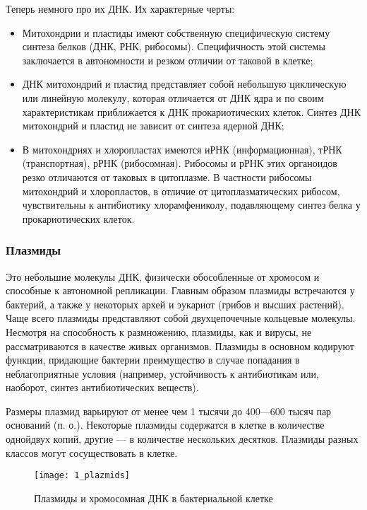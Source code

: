 Теперь немного про их ДНК. Их характерные черты:

\begin{itemize}
	\item Митохондрии и пластиды имеют собственную специфическую систему синтеза белков (ДНК, РНК, рибосомы). Специфичность этой системы заключается в автономности и резком отличии от таковой в клетке;
	
	\item ДНК митохондрий и пластид представляет собой небольшую циклическую или линейную молекулу, которая отличается от ДНК ядра и по своим характеристикам приближается к ДНК прокариотических клеток. Синтез ДНК митохондрий и пластид не зависит от синтеза ядерной ДНК;
	
	\item В митохондриях и хлоропластах имеются иРНК (информационная), тРНК (транспортная), рРНК (рибосомная). Рибосомы и рРНК этих органоидов резко отличаются от таковых в цитоплазме. В частности рибосомы митохондрий и хлоропластов, в отличие от цитоплазматических рибосом, чувствительны к антибиотику хлорамфениколу, подавляющему синтез белка у прокариотических клеток.
\end{itemize}

\subsubsection{Плазмиды}

Это небольшие молекулы ДНК, физически обособленные от хромосом и способные к автономной репликации. Главным образом плазмиды встречаются у бактерий, а также у некоторых архей и эукариот (грибов и высших растений). Чаще всего плазмиды представляют собой двухцепочечные кольцевые молекулы. Несмотря на способность к размножению, плазмиды, как и вирусы, не рассматриваются в качестве живых организмов. Плазмиды в основном кодируют функции, придающие бактерии преимущество в случае попадания в неблагоприятные условия (например, устойчивость к антибиотикам или, наоборот, синтез антибиотических веществ).

Размеры плазмид варьируют от менее чем 1 тысячи до 400—600 тысяч пар оснований (п. о.). Некоторые плазмиды содержатся в клетке в количестве однойдвух копий, другие — в количестве нескольких десятков. Плазмиды разных классов могут сосуществовать в клетке.

\begin{figure}[H]
	\centering
	\texttt{[image: 1\_plazmids]}
	\caption{Плазмиды и хромосомная ДНК в бактериальной клетке}
\end{figure}































